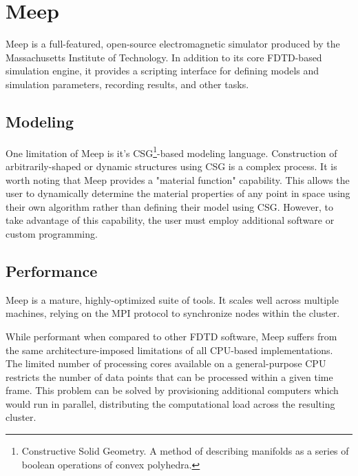 \chapter{Meep} \label{ch:meep}

Meep\cite{OskooiRo10} is a full-featured, open-source electromagnetic simulator produced by the Massachusetts Institute of Technology. In addition to its core FDTD-based simulation engine, it provides a scripting interface for defining models and simulation parameters, recording results, and other tasks.  





\section{Modeling}

\iffalse
************************************************
While I may agree, you need to keep they hyperbole and sarcasm out.  You should re-write this section to state what Meep is, how it is used, and how you made use of some of it's features.  You can also look up how many citations it has (on their website) to showcase that it's widely used and trusted making it a valid point of comparison 
************************************************
\fi

One limitation of Meep is it's CSG\footnote{Constructive Solid Geometry. A method of describing manifolds as a series of boolean operations of convex polyhedra.}-based modeling language. Construction of arbitrarily-shaped or dynamic structures using CSG is a complex process. It is worth noting that Meep provides a "material function" capability. This allows the user to dynamically determine the material properties of any point in space using their own algorithm rather than defining their model using CSG. However, to take advantage of this capability, the user must employ additional software or custom programming. 

\section{Performance}

Meep is a mature, highly-optimized suite of tools. It scales well across multiple machines, relying on the MPI protocol to synchronize nodes within the cluster.

While performant when compared to other FDTD software, Meep suffers from the same architecture-imposed limitations of all CPU-based implementations. The limited number of processing cores available on a general-purpose CPU restricts the number of data points that can be processed within a given time frame. This problem can be solved by provisioning additional computers which would run in parallel, distributing the computational load across the resulting cluster.

